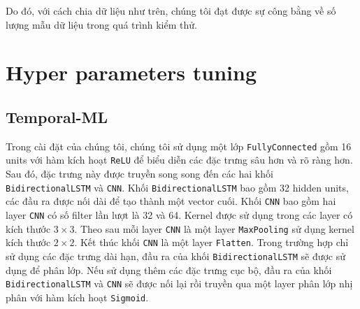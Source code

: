 Do đó, với cách chia dữ liệu như trên, chúng tôi đạt được sự công bằng về số lượng mẫu dữ liệu trong quá trình kiểm thử.

\section{Hyper parameters tuning}

\subsection{Temporal-ML}

Trong cài đặt của chúng tôi, chúng tôi sử dụng một lớp \verb|FullyConnected| gồm 16 units với hàm kích hoạt \verb|ReLU| để biểu diễn các đặc trưng sâu hơn và rõ ràng hơn. Sau đó, đặc trưng này được truyền song song đến các hai khối \verb|BidirectionalLSTM| và \verb|CNN|. Khối \verb|BidirectionalLSTM| bao gồm 32 hidden units, các đầu ra được nối dài để tạo thành một vector cuối. Khối \verb|CNN| bao gồm hai layer \verb|CNN| có số filter lần lượt là 32 và 64. Kernel được sử dụng trong các layer có kích thước $3\times 3$. Theo sau mỗi layer \verb|CNN| là một layer \verb|MaxPooling| sử dụng kernel kích thước $2\times 2$. Kết thúc khối \verb|CNN| là một layer \verb|Flatten|. Trong trường hợp chỉ sử dụng các đặc trưng dài hạn, đầu ra của khối \verb|BidirectionalLSTM| sẽ được sử dụng để phân lớp. Nếu sử dụng thêm các đặc trưng cục bộ, đầu ra của khối \verb|BidirectionalLSTM| và \verb|CNN| sẽ được nối lại rồi truyền qua một layer phân lớp nhị phân với hàm kích hoạt \verb|Sigmoid|.


